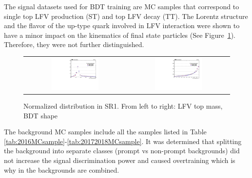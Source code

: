 The signal datasets used for BDT training are MC samples that correspond to single top LFV production (ST) and top LFV decay (TT). The Lorentz structure and the flavor of the up-type quark involved in LFV interaction were shown to have a minor impact on the kinematics of final state particles (See Figure~\ref{fig:Lorentz}). Therefore, they were not further distinguished.  

\begin{figure}[tbh!]
 \begin{center}
 \begin{tabular}{cc}
  \includegraphics[width=0.48\textwidth]{figures/Part3/BDT/LFV_VR_emul_lllOffZMetg20Jetgeq1Bleq1_LFVTopmass_N}&
    \includegraphics[width=0.48\textwidth]{figures/Part3/BDT/LFV_VR_emul_lllOffZMetg20Jetgeq1Bleq1_BDT_TT_N}\\
 \end{tabular}
 \caption{Normalized distribution in SR1. From left to right: LFV top mass, BDT shape}
 \label{fig:Lorentz}
 \end{center}
\end{figure}

The background MC samples include all the samples listed in Table \ref{tab:2016MCsample}-\ref{tab:20172018MCsample}. It was determined that splitting the background into separate classes (prompt vs non-prompt backgrounds) did not increase the signal discrimination power and caused overtraining which is why in the backgrounds are combined. 

